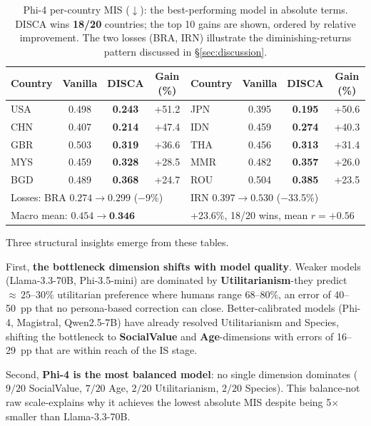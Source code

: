 \documentclass{article}
\providecommand{\gain}{}\renewcommand{\gain}[1]{\textcolor{improvegreen}{#1}}
\providecommand{\loss}{}\renewcommand{\loss}[1]{\textcolor{worsered}{#1}}
\begin{document}
\begin{table}[H]\centering\scriptsize
\caption{Phi-4 per-country MIS ($\downarrow$): the best-performing model in absolute terms. DISCA wins \textbf{18/20} countries; the top 10 gains are shown, ordered by relative improvement. The two losses (BRA, IRN) illustrate the diminishing-returns pattern discussed in \S\ref{sec:discussion}.}
\label{tab:phi4_percountry}
\setlength{\tabcolsep}{4pt}
\begin{tabular}{lccc|lccc}\toprule
Country & Vanilla & DISCA & Gain (\%) & Country & Vanilla & DISCA & Gain (\%) \\\midrule
USA & 0.498 & \textbf{0.243} & \gain{+51.2} & JPN & 0.395 & \textbf{0.195} & \gain{+50.6} \\
CHN & 0.407 & \textbf{0.214} & \gain{+47.4} & IDN & 0.459 & \textbf{0.274} & \gain{+40.3} \\
GBR & 0.503 & \textbf{0.319} & \gain{+36.6} & THA & 0.456 & \textbf{0.313} & \gain{+31.4} \\
MYS & 0.459 & \textbf{0.328} & \gain{+28.5} & MMR & 0.482 & \textbf{0.357} & \gain{+26.0} \\
BGD & 0.489 & \textbf{0.368} & \gain{+24.7} & ROU & 0.504 & \textbf{0.385} & \gain{+23.5} \\
\midrule
\multicolumn{4}{l|}{Losses: BRA $0.274 \to 0.299$ (\loss{$-$9\%})} &
\multicolumn{4}{l}{IRN $0.397 \to 0.530$ (\loss{$-$33.5\%})} \\
\multicolumn{4}{l|}{Macro mean: $0.454 \to \textbf{0.346}$} &
\multicolumn{4}{l}{\gain{+23.6\%}, 18/20 wins, mean $r = +0.56$} \\
\bottomrule
\end{tabular}
\end{table}

Three structural insights emerge from these tables.

First, \textbf{the bottleneck dimension shifts with model quality}. Weaker models (Llama-3.3-70B, Phi-3.5-mini) are dominated by \textbf{Utilitarianism}-they predict ${\approx}\,25$--$30\%$ utilitarian preference where humans range 68--80\%, an error of 40--50~pp that no persona-based correction can close. Better-calibrated models (Phi-4, Magistral, Qwen2.5-7B) have already resolved Utilitarianism and Species, shifting the bottleneck to \textbf{SocialValue} and \textbf{Age}-dimensions with errors of 16--29~pp that are within reach of the IS stage.

Second, \textbf{Phi-4 is the most balanced model}: no single dimension dominates ($9/20$ SocialValue, $7/20$ Age, $2/20$ Utilitarianism, $2/20$ Species). This balance-not raw scale-explains why it achieves the lowest absolute MIS despite being 5$\times$ smaller than Llama-3.3-70B.
\end{document}
